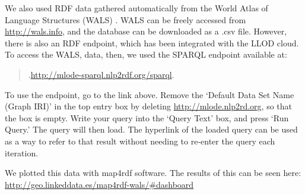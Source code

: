 We also used RDF data gathered automatically from the World Atlas of Language Structures (WALS) \cite{Haspelmath_etal2008}. WALS can be freely accessed from \url{http://wals.info}, and the database can be downloaded as a .csv file. However, there is also an RDF endpoint, which has been integrated with the LLOD cloud. To access the WALS, data, then, we used the SPARQL endpoint available at: \begin{quote}.\url{http://mlode-sparql.nlp2rdf.org/sparql}.\end{quote}

To use the endpoint, go to the link above. Remove the `Default Data Set Name (Graph IRI)' in the top entry box by deleting \url{http://mlode.nlp2rd.org}, so that the box is empty. Write your query into the `Query Text' box, and press `Run Query.' The query will then load. The hyperlink of the loaded query can be used as a way to refer to that result without needing to re-enter the query each iteration. 



We plotted this data with map4rdf software. The results of this can be seen here: \url{http://geo.linkeddata.es/map4rdf-wals/#dashboard}

